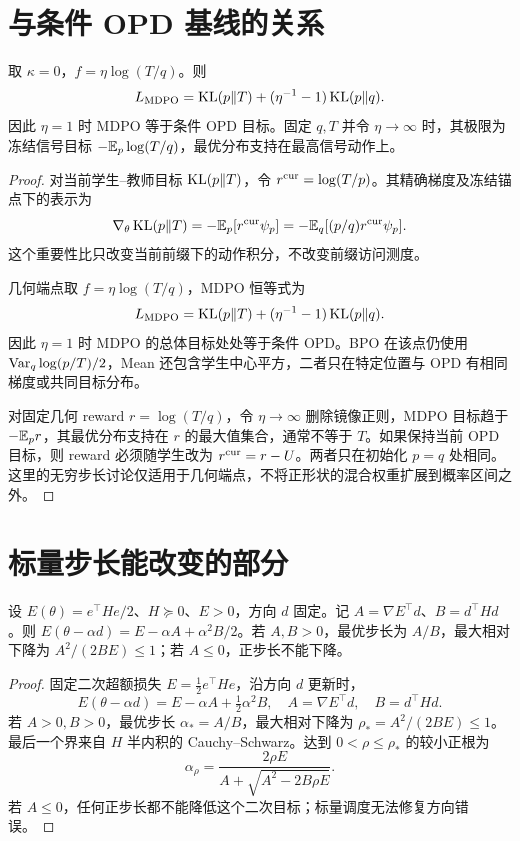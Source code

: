 \section{与条件 OPD 基线的关系}
\begin{proposition}
取 $\kappa=0$，$f=\eta\log(T/q)$。则
\begin{equation}
L_{\rm MDPO}=\operatorname{KL}(p\Vert T)+(\eta^{-1}-1)\operatorname{KL}(p\Vert q).
\end{equation}
因此 $\eta=1$ 时 MDPO 等于条件 OPD 目标。固定 $q,T$ 并令 $\eta\to\infty$ 时，其极限为冻结信号目标 $-\mathbb E_p\log(T/q)$，最优分布支持在最高信号动作上。
\end{proposition}
\begin{proof}
对当前学生--教师目标 $\operatorname{KL}(p\Vert T)$，令 $r^{\rm cur}=\log(T/p)$。其精确梯度及冻结锚点下的表示为
\begin{equation}
\nabla_\theta\operatorname{KL}(p\Vert T)
=-\mathbb E_p[r^{\rm cur}\psi_p]
=-\mathbb E_q[(p/q)r^{\rm cur}\psi_p].
\end{equation}
这个重要性比只改变当前前缀下的动作积分，不改变前缀访问测度。

几何端点取 $f=\eta\log(T/q)$，MDPO 恒等式为
\begin{equation}
L_{\rm MDPO}=\operatorname{KL}(p\Vert T)+(\eta^{-1}-1)\operatorname{KL}(p\Vert q).
\end{equation}
因此 $\eta=1$ 时 MDPO 的总体目标处处等于条件 OPD。BPO 在该点仍使用 $\operatorname{Var}_q\log(p/T)/2$，Mean 还包含学生中心平方，二者只在特定位置与 OPD 有相同梯度或共同目标分布。

对固定几何 reward $r=\log(T/q)$，令 $\eta\to\infty$ 删除镜像正则，MDPO 目标趋于 $-\mathbb E_pr$，其最优分布支持在 $r$ 的最大值集合，通常不等于 $T$。如果保持当前 OPD 目标，则 reward 必须随学生改为 $r^{\rm cur}=r-U$。两者只在初始化 $p=q$ 处相同。这里的无穷步长讨论仅适用于几何端点，不将正形状的混合权重扩展到概率区间之外。
\end{proof}

\section{标量步长能改变的部分}
\begin{proposition}[固定方向的最优步长与下降能力]
设 $E(\theta)=e^\top He/2$、$H\succeq0$、$E>0$，方向 $d$ 固定。记 $A=\nabla E^\top d$、$B=d^\top Hd$。则 $E(\theta-\alpha d)=E-\alpha A+\alpha^2B/2$。若 $A,B>0$，最优步长为 $A/B$，最大相对下降为 $A^2/(2BE)\le1$；若 $A\le0$，正步长不能下降。
\end{proposition}
\begin{proof}
固定二次超额损失 $E=\frac12e^\top He$，沿方向 $d$ 更新时，
\begin{equation}
E(\theta-\alpha d)=E-\alpha A+\tfrac12\alpha^2B,\quad
A=\nabla E^\top d,\quad B=d^\top Hd.
\end{equation}
若 $A>0,B>0$，最优步长 $\alpha_*=A/B$，最大相对下降为 $\rho_*=A^2/(2BE)\le1$。最后一个界来自 $H$ 半内积的 Cauchy--Schwarz。达到 $0<\rho\le\rho_*$ 的较小正根为
\begin{equation}
\alpha_\rho=\frac{2\rho E}{A+\sqrt{A^2-2B\rho E}}.
\end{equation}
若 $A\le0$，任何正步长都不能降低这个二次目标；标量调度无法修复方向错误。
\end{proof}

